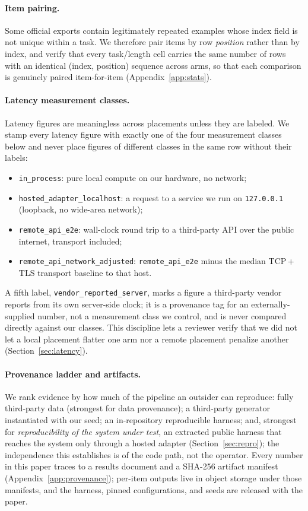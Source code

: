 \documentclass[11pt]{article}
\begin{document}
\paragraph{Item pairing.} Some official exports contain legitimately repeated examples whose
index field is not unique within a task. We therefore pair items by row \emph{position} rather
than by index, and verify that every task/length cell carries the same number of rows with an
identical (index, position) sequence across arms, so that each comparison is genuinely paired
item-for-item (Appendix~\ref{app:stats}).

\paragraph{Latency measurement classes.} Latency figures are meaningless across placements unless
they are labeled. We stamp every latency figure with exactly one of the four measurement classes
below and never place figures of different classes in the same row without their labels:
\begin{itemize}
  \item \texttt{in\_process}: pure local compute on our hardware, no network;
  \item \texttt{hosted\_adapter\_localhost}: a request to a service we run on \texttt{127.0.0.1}
  (loopback, no wide-area network);
  \item \texttt{remote\_api\_e2e}: wall-clock round trip to a third-party API over the public
  internet, transport included;
  \item \texttt{remote\_api\_network\_adjusted}: \texttt{remote\_api\_e2e} minus the median
  TCP\,+\,TLS transport baseline to that host.
\end{itemize}
A fifth label, \texttt{vendor\_reported\_server}, marks a figure a third-party vendor reports from
its own server-side clock; it is a provenance tag for an externally-supplied number, not a
measurement class we control, and is never compared directly against our classes. This discipline
lets a reviewer verify that we did not let a local placement flatter one arm nor a remote placement
penalize another (Section~\ref{sec:latency}).

\paragraph{Provenance ladder and artifacts.} We rank evidence by how much of the pipeline an
outsider can reproduce: fully third-party data (strongest for data provenance); a third-party
generator instantiated with our seed; an in-repository reproducible harness; and, strongest for
\emph{reproducibility of the system under test}, an extracted public harness that reaches the
system only through a hosted adapter (Section~\ref{sec:repro}); the independence this establishes
is of the code path, not the operator. Every number in this
paper traces to a results document and a SHA-256 artifact manifest (Appendix~\ref{app:provenance});
per-item outputs live in object storage under those manifests, and the harness, pinned
configurations, and seeds are released with the paper.
\end{document}
